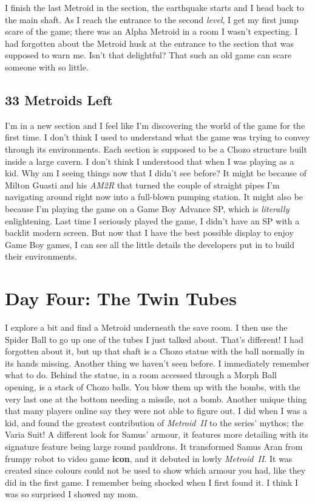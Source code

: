 \documentclass{book}
\begin{document}
I finish the last Metroid in the section, the earthquake starts and I head back to the main shaft. As I reach the entrance to the second \emph{level}, I get my first jump scare of the game; there was an Alpha Metroid in a room I wasn’t expecting. I had forgotten about the Metroid husk at the entrance to the section that was supposed to warn me. Isn’t that delightful? That such an old game can scare someone with so little.\par
\FloatBarrier\subsection*{33 Metroids Left}
I’m in a new section and I feel like I’m discovering the world of the game for the first time. I don’t think I used to understand what the game was trying to convey through its environments. Each section is supposed to be a Chozo structure built inside a large cavern. I don’t think I understood that when I was playing as a kid. Why am I seeing things now that I didn’t see before? It might be because of Milton Guasti and his \emph{AM2R} that turned the couple of straight pipes I’m navigating around right now into a full-blown pumping station. It might also be because I’m playing the game on a Game Boy Advance SP, which is \emph{literally} enlightening. Last time I seriously played the game, I didn’t have an SP with a backlit modern screen. But now that I have the best possible display to enjoy Game Boy games, I can see all the little details the developers put in to build their environments.\par
\FloatBarrier\section*{Day Four: The Twin Tubes}
I explore a bit and find a Metroid underneath the save room. I then use the Spider Ball to go up one of the tubes I just talked about. That’s different! I had forgotten about it, but up that shaft is a Chozo statue with the ball normally in its hands missing. Another thing we haven’t seen before. I immediately remember what to do. Behind the statue, in a room accessed through a Morph Ball opening, is a stack of Chozo balls. You blow them up with the bombs, with the very last one at the bottom needing a missile, not a bomb. Another unique thing that many players online say they were not able to figure out. I did when I was a kid, and found the greatest contribution of \emph{Metroid~II} to the series’ mythos; the Varia Suit! A different look for Samus’ armour, it features more detailing with its signature feature being large round pauldrons. It transformed Samus Aran from frumpy robot to video game \textbf{icon}, and it debuted in lowly \emph{Metroid~II}. It was created since colours could not be used to show which armour you had, like they did in the first game. I remember being shocked when I first found it. I think I was so surprised I showed my mom.\par
\end{document}
